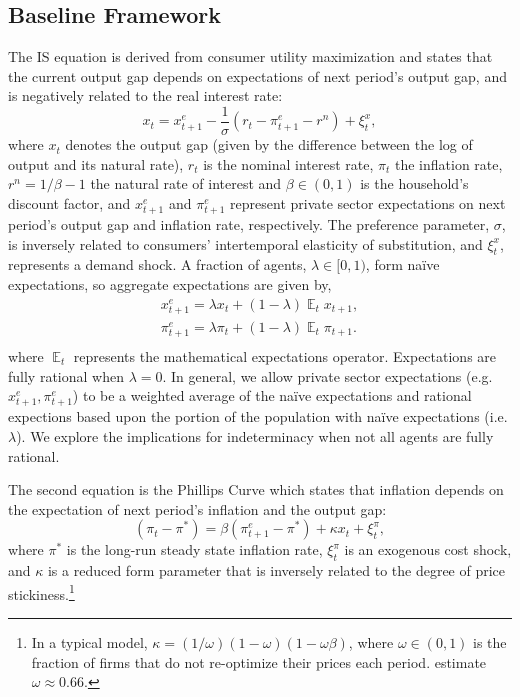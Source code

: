 \documentclass[english,authoryear,12pt]{elsarticle}
\DeclareMathOperator{\E}{\mathbb{E}}
\begin{document}
\subsection{Baseline Framework}

The IS equation is derived from consumer utility maximization and states that the current output gap depends on expectations of next period's output gap, and is negatively related to the real interest rate:
\begin{equation}\label{eq:ISe}
	x_t = x_{t+1}^e - \frac{1}{\sigma} \left( r_t - \pi_{t+1}^e  - r^n  \right) + \xi_t^{x},
\end{equation}
where $x_t$ denotes the output gap (given by the difference between the log of output and its natural rate), $r_t$ is the nominal interest rate, $\pi_t$ the inflation rate, $r^n = 1/\beta - 1$ the natural rate of interest and $\beta \in (0,1)$ is the household's discount factor, and $x_{t+1}^e$ and $\pi_{t+1}^e$ represent private sector expectations on next period's output gap and inflation rate, respectively. The preference parameter, $\sigma$, is inversely related to consumers' intertemporal elasticity of substitution, and $\xi_t^x$, represents a demand shock. A fraction of agents, $\lambda\in[0,1)$, form na\"ive expectations, so aggregate expectations are given by,
\begin{equation}
	\begin{array}{c}
		x_{t+1}^e = \lambda x_t + (1-\lambda) \E_t x_{t+1}, \\ [1.5pc]
		\pi_{t+1}^e = \lambda \pi_t + (1-\lambda) \E_t \pi_{t+1}. \\
	\end{array}
\end{equation}
where $\E_t$ represents the mathematical expectations operator. Expectations are fully rational when $\lambda=0$. In general, we allow private sector expectations (e.g. $x_{t+1}^e,\pi_{t+1}^e$) to be a  weighted average of the na\"ive expectations and rational expections based upon the portion of the population with na\"ive expectations (i.e. $\lambda$). We explore the implications for indeterminacy when not all agents are fully rational.

The second equation is the Phillips Curve which states that inflation depends on the expectation of next period's inflation and the output gap:
\begin{equation}\label{eq:PhillipsCurvee}
	(\pi_t - \pi^*) = \beta (\pi_{t+1}^e - \pi^*) + \kappa x_t + \xi_t^{\pi},
\end{equation}
where $\pi^*$ is the long-run steady state inflation rate, $\xi_t^\pi$ is an exogenous cost shock, and $\kappa$ is a reduced form parameter that is inversely related to the degree of price stickiness.\footnote{In a typical model, $\kappa=(1/\omega)(1-\omega)(1-\omega\beta)$, where $\omega \in (0,1)$ is the fraction of firms that do not re-optimize their prices each period. \citet{smetswouters2007} estimate $\omega \approx 0.66$.}
\end{document}
